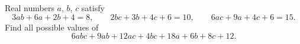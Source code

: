 Real numbers $a$, $b$, $c$ satisfy
\[3ab+6a+2b+4=8,\qquad 2bc+3b+4c+6=10,\qquad 6ac+9a+4c+6=15.\]
Find all possible values of
\[6abc+9ab+12ac+4bc+18a+6b+8c+12.\]
